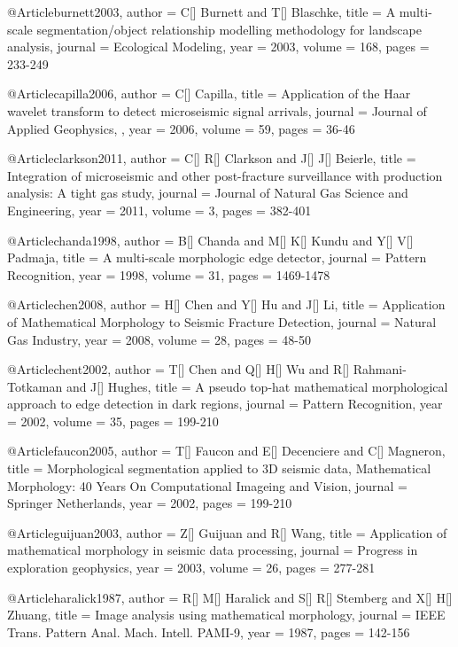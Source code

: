   @Article{burnett2003,
  author = 	 {C[] Burnett and T[] Blaschke},
  title = 	 {A multi-scale segmentation/object relationship modelling methodology for landscape analysis},
  journal = 	 {Ecological Modeling},
  year = 	 2003,
  volume = 	 168,
  pages = 	 {233-249}}
  
   @Article{capilla2006,
  author = 	 {C[] Capilla},
  title = 	 {Application of the Haar wavelet transform to detect microseismic signal arrivals},
  journal = 	 {Journal of Applied Geophysics,
},
  year = 	 2006,
  volume = 	 59,
  pages = 	 {36-46}}
  
    @Article{clarkson2011,
  author = 	 {C[] R[] Clarkson and J[] J[] Beierle},
  title = 	 {Integration of microseismic and other post-fracture surveillance
with production analysis: A tight gas study},
  journal = 	 {Journal of Natural Gas Science and Engineering},
  year = 	 2011,
  volume = 	 3,
  pages = 	 {382-401}} 
  
    @Article{chanda1998,
  author = 	 {B[] Chanda and M[] K[] Kundu and Y[] V[] Padmaja},
  title = 	 {A multi-scale morphologic edge detector},
  journal = 	 {Pattern Recognition},
  year = 	 1998,
  volume = 	 31,
  pages = 	 {1469-1478}} 
  
    @Article{chen2008,
  author = 	 {H[] Chen and Y[] Hu and J[] Li},
  title = 	 {Application of Mathematical Morphology to Seismic Fracture Detection},
  journal = 	 {Natural Gas Industry},
  year = 	 2008,
  volume = 	 28,
  pages = 	 {48-50}}   
  
    @Article{chent2002,
  author = 	 {T[] Chen and Q[] H[] Wu and R[] Rahmani-Totkaman and J[] Hughes},
  title = 	 {A pseudo top-hat mathematical
morphological approach to edge detection in dark regions},
  journal = 	 {Pattern Recognition},
  year = 	 2002,
  volume = 	 35,
  pages = 	 {199-210}}   
  
@Article{faucon2005,
  author = 	 {T[] Faucon and E[] Decenciere and C[] Magneron},
  title = 	 {Morphological segmentation applied to 3{D} seismic data, Mathematical Morphology: 40 Years On Computational Imageing and Vision},
  journal = 	 {Springer Netherlands},
  year = 	 2002,
  pages = 	 {199-210}}      
  
    @Article{guijuan2003,
  author = 	 {Z[] Guijuan and R[] Wang},
  title = 	 {Application of mathematical morphology in seismic data processing},
  journal = 	 {Progress in exploration geophysics},
  year = 	 2003,
  volume = 	 26,
  pages = 	 {277-281}}     
   
@Article{haralick1987,
  author = 	 {R[] M[] Haralick and S[] R[] Stemberg and X[] H[] Zhuang},
  title = 	 {Image analysis using mathematical morphology},
  journal = 	 {IEEE Trans. Pattern Anal. Mach. Intell. PAMI-9},
  year = 	 1987,
  pages = 	 {142-156}}    
  
